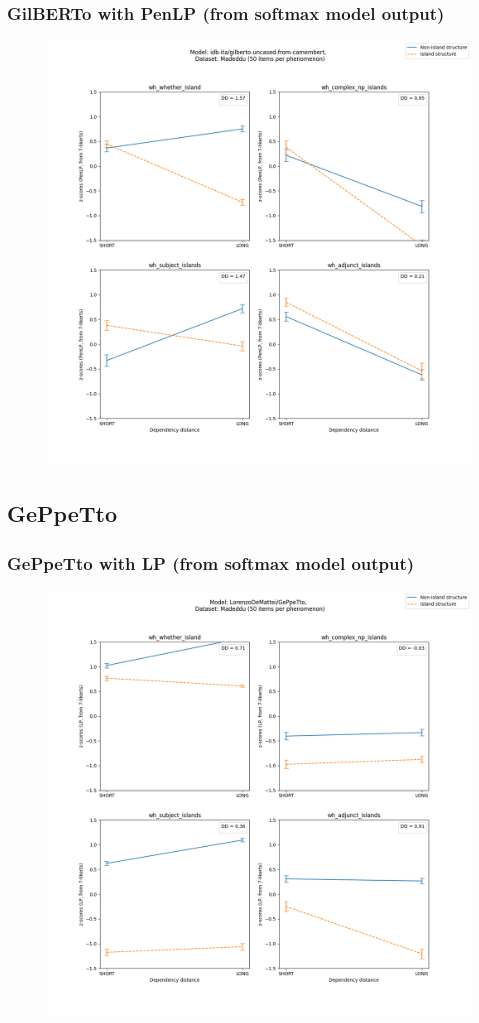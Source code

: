 \subsubsection{GilBERTo with PenLP (from softmax model output)}
\begin{figure}[h]
	\centering
	\includegraphics[width=1\textwidth]{images/AppendixA/Madeddu_wh_idb-ita_gilberto-uncased-from-camembert_PenLP-zscores-likert-2022-09-16_h10m26s47.png} 
\end{figure}

\clearpage
\subsection{GePpeTto}
\subsubsection{GePpeTto with LP (from softmax model output)}
\begin{figure}[h]
	\centering
	\includegraphics[width=1\textwidth]{images/AppendixA/Madeddu_wh_LorenzoDeMattei_GePpeTto_LP-zscores-likert-2022-09-14_h15m28s58.png} 
\end{figure}


